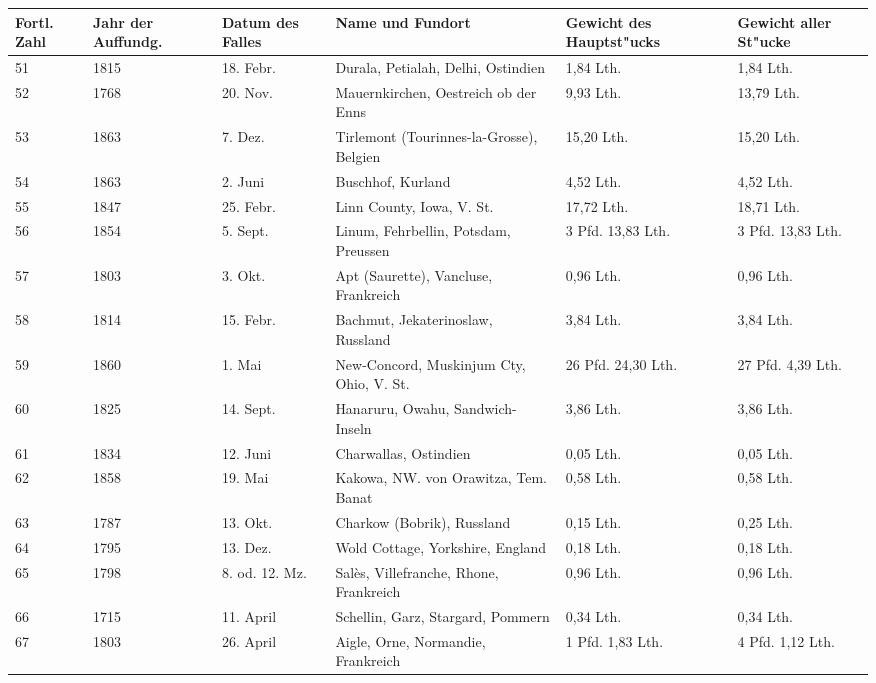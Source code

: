 \documentclass[a4paper, 11pt, oneside]{article}
\begin{document}
\begin{center}
\begin{footnotesize}
\begin{tabular}{ |p{7mm}|p{7mm}|p{13mm}|p{48mm}|p{22mm}|p{22mm}| }
    \hline
    Fortl. Zahl & Jahr der Auffundg. & Datum des Falles & Name und Fundort & Gewicht des Hauptst"ucks & Gewicht aller St"ucke\\
    \hline\hline
    51 & 1815 & 18. Febr. & Durala, Petialah, Delhi, Ostindien & 1,84 Lth. & 1,84 Lth.\\\hline
    52 & 1768 & 20. Nov. & Mauernkirchen, Oestreich ob der Enns & 9,93 Lth. & 13,79 Lth.\\\hline
    53 & 1863 & 7. Dez. & Tirlemont (Tourinnes-la-Grosse), Belgien & 15,20 Lth. & 15,20 Lth.\\\hline
    54 & 1863 & 2. Juni & Buschhof, Kurland & 4,52 Lth. & 4,52 Lth.\\\hline
    55 & 1847 & 25. Febr. & Linn County, Iowa, V. St. & 17,72 Lth. & 18,71 Lth.\\\hline
    56 & 1854 & 5. Sept. & Linum, Fehrbellin, Potsdam, Preussen & 3 Pfd. 13,83 Lth. & 3 Pfd. 13,83 Lth.\\\hline
    57 & 1803 & 3. Okt. & Apt (Saurette), Vancluse, Frankreich & 0,96 Lth. & 0,96 Lth.\\\hline
    58 & 1814 & 15. Febr. & Bachmut, Jekaterinoslaw, Russland & 3,84 Lth. & 3,84 Lth.\\\hline
    59 & 1860 & 1. Mai & New-Concord, Muskinjum Cty, Ohio, V. St. & 26 Pfd. 24,30 Lth. & 27 Pfd. 4,39 Lth.\\\hline
    60 & 1825 & 14. Sept. & Hanaruru, Owahu, Sandwich-Inseln & 3,86 Lth. & 3,86 Lth.\\\hline
    61 & 1834 & 12. Juni & Charwallas, Ostindien & 0,05 Lth. & 0,05 Lth.\\\hline
    62 & 1858 & 19. Mai & Kakowa, NW. von Orawitza, Tem. Banat & 0,58 Lth. & 0,58 Lth.\\\hline
    63 & 1787 & 13. Okt. & Charkow (Bobrik), Russland & 0,15 Lth. & 0,25 Lth.\\\hline
    64 & 1795 & 13. Dez. & Wold Cottage, Yorkshire, England & 0,18 Lth. & 0,18 Lth.\\\hline
    65 & 1798 & 8. od. 12. Mz. & Salès, Villefranche, Rhone, Frankreich & 0,96 Lth. & 0,96 Lth.\\\hline
    66 & 1715 & 11. April & Schellin, Garz, Stargard, Pommern & 0,34 Lth. & 0,34 Lth.\\\hline
    67 & 1803 & 26. April & Aigle, Orne, Normandie, Frankreich & 1 Pfd. 1,83 Lth. & 4 Pfd. 1,12 Lth.\\\hline

\end{tabular}
\end{footnotesize}
\end{center}
\end{document}

